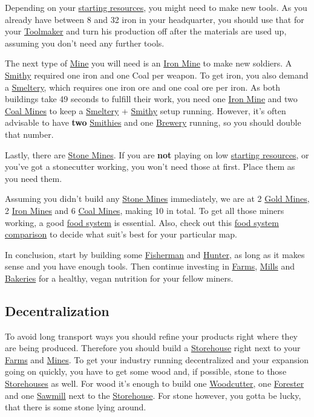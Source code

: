 \documentclass[12pt]{article}
\begin{document}
Depending on your \hyperref[sec:startresources]{starting resources}, you might need to make new tools. As you already have between 8 and 32 iron in your headquarter, you should use that for your \hyperref[sec:toolmaker]{Toolmaker} and turn his production off after the materials are used up, assuming you don't need any further tools.

The next type of \hyperref[sec:mine]{Mine} you will need is an \hyperref[sec:ironmine]{Iron Mine} to make new soldiers. A \hyperref[sec:smithy]{Smithy} required one iron and one Coal per weapon. To get iron, you also demand a \hyperref[sec:smeltery]{Smeltery}, which requires one iron ore and one coal ore per iron. As both buildings take 49 seconds to fulfill their work, you need one \hyperref[sec:ironmine]{Iron Mine} and two \hyperref[sec:coalmine]{Coal Mines} to keep a \hyperref[sec:smeltery]{Smeltery} + \hyperref[sec:smithy]{Smithy} setup running. However, it's often advisable to have \textbf{two} \hyperref[sec:smithy]{Smithies} and one \hyperref[sec:brewery]{Brewery} running, so you should double that number.

Lastly, there are \hyperref[sec:stonemine]{Stone Mines}. If you are \textbf{not} playing on low \hyperref[sec:startresources]{starting resources}, or you've got a stonecutter working, you won't need those at first. Place them as you need them.

Assuming you didn't build any \hyperref[sec:stonemine]{Stone Mines} immediately, we are at 2 \hyperref[sec:goldmine]{Gold Mines}, 2 \hyperref[sec:ironmine]{Iron Mines} and 6 \hyperref[sec:coalmine]{Coal Mines}, making 10 in total. To get all those miners working, a good \hyperref[sec:foodsystems]{food system} is essential. Also, check out this \hyperref[sec:foodsystemcomparison]{food system comparison} to decide what suit's best for your particular map.

In conclusion, start by building some \hyperref[sec:fisherman]{Fisherman} and \hyperref[sec:hunter]{Hunter}, as long as it makes sense and you have enough tools.
Then continue investing in \hyperref[sec:farm]{Farms}, \hyperref[sec:mill]{Mills} and \hyperref[sec:bakery]{Bakeries} for a healthy, vegan nutrition for your fellow miners.

\subsection{Decentralization}
\label{sec:decentralization}

To avoid long transport ways you should refine your products right where they are being produced. Therefore you should build a \hyperref[sec:storehouse]{Storehouse} right next to your \hyperref[sec:farm]{Farms} and \hyperref[sec:mine]{Mines}. To get your industry running decentralized and your expansion going on quickly, you have to get some wood and, if possible, stone to those \hyperref[sec:storehouse]{Storehouses} as well. For wood it's enough to build one \hyperref[sec:woodcutter]{Woodcutter}, one \hyperref[sec:forester]{Forester} and one \hyperref[sec:sawmill]{Sawmill} next to the \hyperref[sec:storehouse]{Storehouse}. For stone however, you gotta be lucky, that there is some stone lying around.
\end{document}

